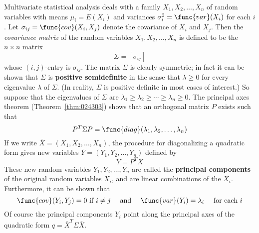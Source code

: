Multivariate statistical analysis deals with a family $X_{1}, X_{2}, \dots, X_{n}$ of random variables with means $\mu_{i} = E(X_{i})$ and variances $\sigma_{i}^2 = \func{var}(X_{i})$ for each $i$. Let $\sigma_{ij} = \func{cov}(X_{i}, X_{j})$ denote the covariance of $X_{i}$ and $X_{j}$. Then the \textit{covariance matrix} of the random variables $X_{1}, X_{2}, \dots, X_{n}$ is defined to be the $n \times n$ matrix
\begin{equation*}
\Sigma = [\sigma_{ij}]
\end{equation*}
whose $(i, j)$-entry is $\sigma_{ij}$. The matrix $\Sigma$ is clearly symmetric; in fact it can be shown that $\Sigma$ is \textbf{positive semidefinite} in the sense that $\lambda \geq 0$ for every eigenvalue $\lambda$ of $\Sigma$. (In reality, $\Sigma$ is positive definite in most cases of interest.) So suppose that the eigenvalues of $\Sigma$ are $\lambda_{1} \geq \lambda_{2} \geq \cdots \geq \lambda_{n} \geq 0$. The principal axes theorem (Theorem~\ref{thm:024303}) shows that an orthogonal matrix $P$ exists such that
\begin{equation*}
P^T\Sigma P = \func{diag}(\lambda_{1}, \lambda_{2}, \dots, \lambda_{n})
\end{equation*}
If we write $\overline{X} = (X_{1}, X_{2}, \dots, X_{n})$, the procedure for diagonalizing a quadratic form gives new variables $\overline{Y} = (Y_{1}, Y_{2}, \dots, Y_{n})$ defined by
\begin{equation*}
\overline{Y} = P^T\overline{X}
\end{equation*}
These new random variables $Y_{1}, Y_{2}, \dots, Y_{n}$ are called the \textbf{principal components} of the original random variables $X_{i}$, and are linear combinations of the $X_{i}$. Furthermore, it can be shown that
\begin{equation*}
\func{cov}(Y_{i}, Y_{j}) = 0 \mbox{ if } i \neq j \quad \mbox{ and } \quad \func{var}(Y_{i}) = \lambda_{i} \quad \mbox{ for each } i
\end{equation*}
Of course the principal components $Y_{i}$ point along the principal axes of the quadratic form $q = \overline{X}^T\Sigma\overline{X}$.


